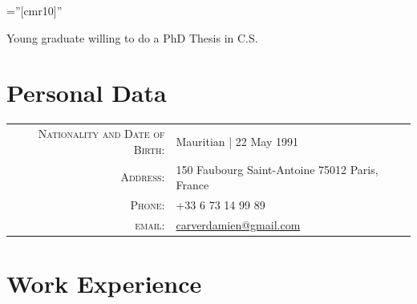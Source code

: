 \documentclass[a4paper,10pt]{article} %
\begin{document}
\pagestyle{empty} %

\font\fb=''[cmr10]'' %


\par{\bigskip\par}
\par{\centering \footnotesize Young graduate willing to do a PhD Thesis in C.S. \par}

\section{Personal Data}

\begin{tabular}{rl}
	\textsc{Nationality and Date of Birth:} & Mauritian  | 22 May 1991 \\
	\textsc{Address:} & 150 Faubourg Saint-Antoine 75012 Paris, France\\
	\textsc{Phone:} & +33 6 73 14 99 89\\
	\textsc{email:} & \href{carverdamien@gmail.com}{carverdamien@gmail.com}
\end{tabular}


\section{Work Experience}
\end{document}

